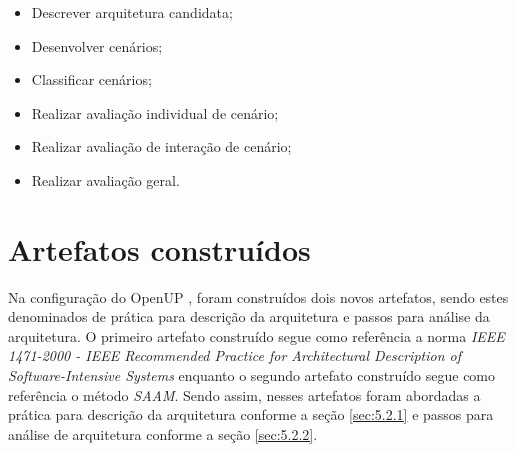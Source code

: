 \begin{itemize}
    \item Descrever arquitetura candidata;
    \item Desenvolver cenários;
    \item Classificar cenários;
    \item Realizar avaliação individual de cenário;
    \item Realizar avaliação de interação de cenário;
    \item Realizar avaliação geral.


\end{itemize}

\section{Artefatos construídos}

Na configuração do OpenUP , foram construídos dois novos artefatos, sendo estes denominados de prática para descrição da arquitetura e passos para análise da arquitetura. O primeiro artefato construído segue como referência a norma \emph{IEEE 1471-2000 - IEEE Recommended Practice for Architectural Description of Software-Intensive Systems} enquanto o segundo artefato construído segue como referência o método \emph{\acrfull{SAAM}}. Sendo assim, nesses artefatos foram abordadas a prática para descrição da arquitetura conforme a seção  \ref{sec:5.2.1} e passos para análise de arquitetura conforme a seção \ref{sec:5.2.2}. 


